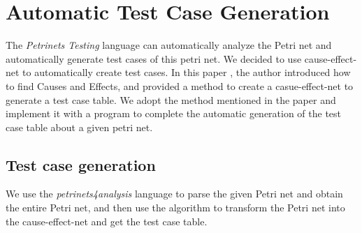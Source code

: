 
\section{Automatic Test Case Generation}\label{sec:automatically generates testcase}
\label{sec:generation}

The \emph{Petrinets Testing} language can automatically analyze the Petri net and automatically generate test cases of this petri net. We decided to use cause-effect-net \cite{Desel1997} to automatically create test cases. In this paper \cite{Desel1997}, the author introduced how to find Causes and Effects, and provided a method to create a casue-effect-net to generate a test case table. We adopt the method mentioned in the paper and implement it with a program to complete the automatic generation of the test case table about a given petri net.

\subsection{Test case generation}
We use the \emph{petrinets4analysis} language to parse the given Petri net and obtain the entire Petri net, and then use the algorithm to transform the Petri net into the cause-effect-net and get the test case table. \\

